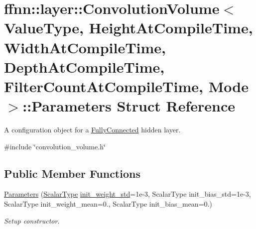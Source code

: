 \hypertarget{structffnn_1_1layer_1_1_convolution_volume_1_1_parameters}{\section{ffnn\-:\-:layer\-:\-:Convolution\-Volume$<$ Value\-Type, Height\-At\-Compile\-Time, Width\-At\-Compile\-Time, Depth\-At\-Compile\-Time, Filter\-Count\-At\-Compile\-Time, Mode $>$\-:\-:Parameters Struct Reference}
\label{structffnn_1_1layer_1_1_convolution_volume_1_1_parameters}
}


A configuration object for a \hyperlink{classffnn_1_1layer_1_1_fully_connected}{Fully\-Connected} hidden layer.  




{\ttfamily \#include \char`\"{}convolution\-\_\-volume.\-h\char`\"{}}

\subsection*{Public Member Functions}
\begin{DoxyCompactItemize}
\item 
\hyperlink{structffnn_1_1layer_1_1_convolution_volume_1_1_parameters_a668bf7767997224af81e3783d4ce47b0}{Parameters} (\hyperlink{classffnn_1_1layer_1_1_convolution_volume_aee5896ca6c930a673234c66446753432}{Scalar\-Type} \hyperlink{structffnn_1_1layer_1_1_convolution_volume_1_1_parameters_a39653215150d3d33ec8914737509e7c2}{init\-\_\-weight\-\_\-std}=1e-\/3, Scalar\-Type init\-\_\-bias\-\_\-std=1e-\/3, Scalar\-Type init\-\_\-weight\-\_\-mean=0., Scalar\-Type init\-\_\-bias\-\_\-mean=0.)
\begin{DoxyCompactList}\small\item\em Setup constructor. \end{DoxyCompactList}\end{DoxyCompactItemize}
